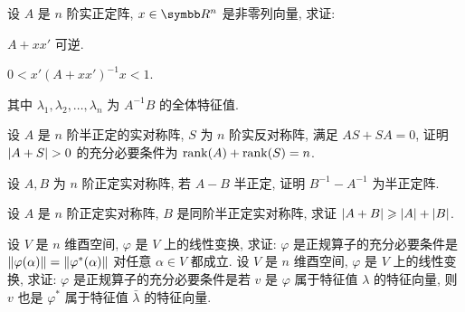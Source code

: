 \documentclass{ctexart}
\begin{document}
\begin{exercise}[series=exer]
    \item 设 $ A $ 是 $ n $ 阶实正定阵, $ x \in \R^{n} $ 是非零列向量, 求证:
    \begin{exercise}
        \item $ A + xx' $ 可逆.
        \item $ 0 < x'(A+xx')^{-1}x < 1 $. 
    \end{exercise}
    其中 $ \lambda_{1}, \lambda_{2}, \dots, \lambda_{n} $ 为 $ A^{-1}B $ 的全体特征值.
    \item 设 $ A $ 是 $ n $ 阶半正定的实对称阵, $ S $ 为 $ n $ 阶实反对称阵, 满足 $ AS + SA = 0 $, 证明 $ \abs{A + S} > 0 $ 的充分必要条件为 $ \rank(A) + \rank(S) = n $. 
    \item 设 $ A, B $ 为 $ n $ 阶正定实对称阵, 若 $ A - B $ 半正定, 证明 $ B^{-1} - A^{-1} $ 为半正定阵.
    \item 设 $ A $ 是 $ n $ 阶正定实对称阵, $ B $ 是同阶半正定实对称阵, 求证 $ \abs{A + B} \geqslant \abs{A} + \abs{B} $. 
    \item 设 $ V $ 是 $ n $ 维酉空间, $ \varphi $ 是 $ V $ 上的线性变换, 求证: $ \varphi $ 是正规算子的充分必要条件是 $ \norm{\varphi(\alpha)} = \norm{\varphi^{*}(\alpha)} $ 对任意 $ \alpha \in V $ 都成立.
    \sitem 设 $ V $ 是 $ n $ 维酉空间, $ \varphi $ 是 $ V $ 上的线性变换, 求证: $ \varphi $ 是正规算子的充分必要条件是若 $ v $ 是 $ \varphi $ 属于特征值 $ \lambda $ 的特征向量, 则 $ v $ 也是 $ \varphi^{*} $ 属于特征值 $ \bar\lambda $ 的特征向量.
\end{exercise} 
\end{document}
